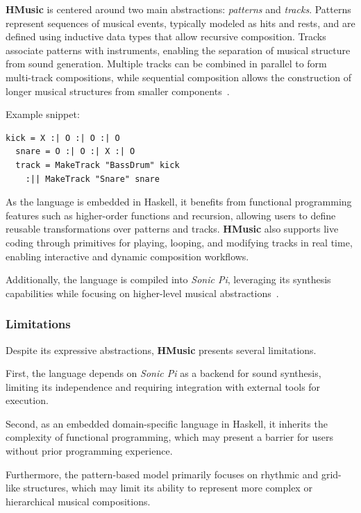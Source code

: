 \textbf{HMusic} is centered around two main abstractions: \textit{patterns} and \textit{tracks}.
Patterns represent sequences of musical events, typically modeled as hits and rests, and are defined using
inductive data types that allow recursive composition.
Tracks associate patterns with instruments, enabling the separation of musical structure from sound generation.
Multiple tracks can be combined in parallel to form multi-track compositions, while sequential composition allows
the construction of longer musical structures from smaller components~\cite{Du_Bois_Ribeiro_2019}.

Example snippet:

\begin{lstlisting}[label={detail-lst:hmusic-1}]
  kick = X :| O :| O :| O
  snare = O :| O :| X :| O
  track = MakeTrack "BassDrum" kick
    :|| MakeTrack "Snare" snare
\end{lstlisting}

As the language is embedded in Haskell, it benefits from functional programming features such as higher-order functions
and recursion, allowing users to define reusable transformations over patterns and tracks.
\textbf{HMusic} also supports live coding through primitives for playing, looping, and modifying tracks in real time,
enabling interactive and dynamic composition workflows.

Additionally, the language is compiled into \textit{Sonic Pi}, leveraging its synthesis capabilities while focusing
on higher-level musical abstractions~\cite{Du_Bois_Ribeiro_2019}.


\subsubsection{Limitations}

Despite its expressive abstractions, \textbf{HMusic} presents several limitations.

First, the language depends on \textit{Sonic Pi} as a backend for sound synthesis, limiting its independence and
requiring integration with external tools for execution.

Second, as an embedded domain-specific language in Haskell, it inherits the complexity of functional
programming, which may present a barrier
for users without prior programming experience.

Furthermore, the pattern-based model primarily focuses on rhythmic and grid-like structures, which may limit its ability
to represent more complex or hierarchical musical compositions.

